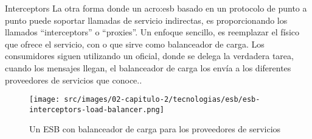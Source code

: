 Interceptors
La otra forma donde un \gls{acro:esb} basado en un protocolo de punto a punto puede soportar llamadas de servicio indirectas, es proporcionando los llamados ``interceptors'' o ``proxies''. Un enfoque sencillo, es reemplazar el  físico que ofrece el servicio, con  o  que sirve como balanceador de carga. Los consumidores siguen utilizando un  oficial, donde se delega la verdadera tarea, cuando los mensajes llegan, el balanceador de carga los envía a los diferentes proveedores de servicios que conoce.\cite[p.~52]{josuttis2007}.

\begin{figure}[H]
  \texttt{[image: src/images/02-capitulo-2/tecnologias/esb/esb-interceptors-load-balancer.png]}
  \caption{Un ESB con balanceador de carga para los proveedores de servicios}
  \label{fig:esb-interceptors-load-balancer}
\end{figure}

